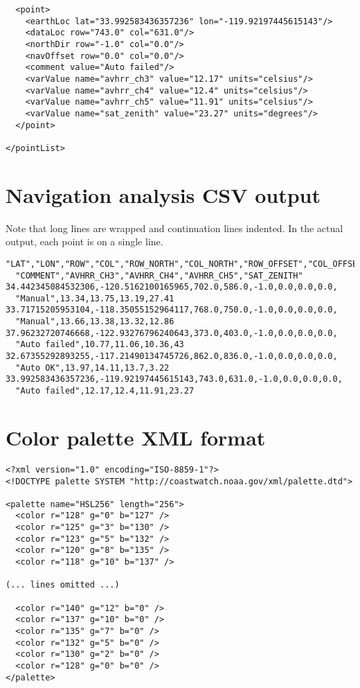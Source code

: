 \begin{verbatim}
  <point>
    <earthLoc lat="33.992583436357236" lon="-119.92197445615143"/>
    <dataLoc row="743.0" col="631.0"/>
    <northDir row="-1.0" col="0.0"/>
    <navOffset row="0.0" col="0.0"/>
    <comment value="Auto failed"/>
    <varValue name="avhrr_ch3" value="12.17" units="celsius"/>
    <varValue name="avhrr_ch4" value="12.4" units="celsius"/>
    <varValue name="avhrr_ch5" value="11.91" units="celsius"/>
    <varValue name="sat_zenith" value="23.27" units="degrees"/>
  </point>

</pointList>
\end{verbatim}

\section{Navigation analysis CSV output}
\label{nav_csv}

Note that long lines are wrapped and continuation lines indented.
In the actual output, each point is on a single line.

\begin{verbatim}
"LAT","LON","ROW","COL","ROW_NORTH","COL_NORTH","ROW_OFFSET","COL_OFFSET",
  "COMMENT","AVHRR_CH3","AVHRR_CH4","AVHRR_CH5","SAT_ZENITH"
34.442345084532306,-120.5162100165965,702.0,586.0,-1.0,0.0,0.0,0.0,
  "Manual",13.34,13.75,13.19,27.41
33.71715205953104,-118.35055152964117,768.0,750.0,-1.0,0.0,0.0,0.0,
  "Manual",13.66,13.38,13.32,12.86
37.96232720746668,-122.93276796240643,373.0,403.0,-1.0,0.0,0.0,0.0,
  "Auto failed",10.77,11.06,10.36,43
32.67355292893255,-117.21490134745726,862.0,836.0,-1.0,0.0,0.0,0.0,
  "Auto OK",13.97,14.11,13.7,3.22
33.992583436357236,-119.92197445615143,743.0,631.0,-1.0,0.0,0.0,0.0,
  "Auto failed",12.17,12.4,11.91,23.27
\end{verbatim}

\section{Color palette XML format}
\label{palette_xml}

\begin{verbatim}
<?xml version="1.0" encoding="ISO-8859-1"?>
<!DOCTYPE palette SYSTEM "http://coastwatch.noaa.gov/xml/palette.dtd">

<palette name="HSL256" length="256">
  <color r="128" g="0" b="127" />
  <color r="125" g="3" b="130" />
  <color r="123" g="5" b="132" />
  <color r="120" g="8" b="135" />
  <color r="118" g="10" b="137" />

(... lines omitted ...)

  <color r="140" g="12" b="0" />
  <color r="137" g="10" b="0" />
  <color r="135" g="7" b="0" />
  <color r="132" g="5" b="0" />
  <color r="130" g="2" b="0" />
  <color r="128" g="0" b="0" />
</palette>
\end{verbatim}